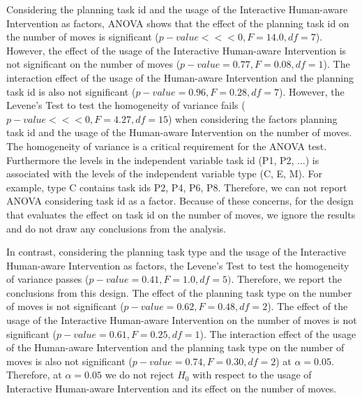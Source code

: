 Considering the planning task id and the usage of the Interactive Human-aware Intervention as factors, ANOVA shows that the effect of the planning task id on the number of moves is significant ($p-value<<<0, F=14.0 ,df=7$).
However, the effect of the usage of the Interactive Human-aware Intervention is not significant on the number of moves ($p-value=0.77, F=0.08 ,df=1$).
The interaction effect of the usage of the Human-aware Intervention and the planning task id is also not significant ($p-value=0.96,F=0.28, df=7$).
However, the Levene's Test to test the homogeneity of variance fails ($p-value<<<0, F=4.27, df=15$) when considering the factors planning task id and the usage of the Human-aware Intervention on the number of moves.
The homogeneity of variance is a critical requirement for the ANOVA test.
Furthermore the levels in the independent variable task id (P1, P2, $\ldots$) is associated with the levels of the independent variable type (C, E, M).
For example, type C contains task ids P2, P4, P6, P8.
Therefore, we can not report ANOVA considering task id as a factor.
Because of these concerns, for the design that evaluates the effect on task id on the number of moves, we ignore the results and do not draw any conclusions from the analysis.

In contrast, considering the planning task type and the usage of the Interactive Human-aware Intervention as factors, the Levene's Test to test the homogeneity of variance passes ($p-value=0.41, F=1.0, df=5)$.
Therefore, we report the conclusions from this design.
The effect of the planning task type on the number of moves is not significant ($p-value=0.62, F=0.48, df=2$).
The effect of the usage of the Interactive Human-aware Intervention on the number of moves is not significant ($p-value=0.61, F=0.25,  df=1$).
The interaction effect of the usage of the Human-aware Intervention and the planning task type on the number of moves is also not significant ($p-value=0.74, F=0.30, df=2$) at $\alpha=0.05$.
Therefore, at $\alpha=0.05$ we do not reject $H_0$ with respect to the usage of Interactive Human-aware Intervention and its effect on the number of moves.


